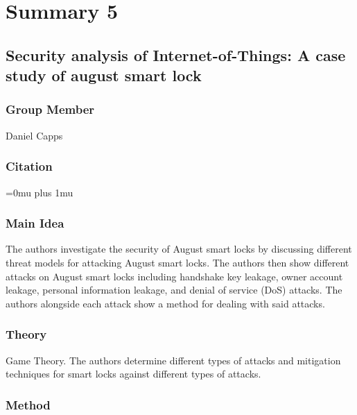 \section{Summary 5}

\noindent
\subsection{{S}ecurity analysis of {I}nternet-of-{T}hings: {A} case study of august smart lock}

\subsubsection{Group Member}

\noindent
Daniel Capps

\noindent
\subsubsection{Citation}

\Urlmuskip=0mu plus 1mu\relax


\subsubsection{Main Idea}

\noindent
The authors investigate the security of August smart locks by discussing different threat models for attacking August smart locks. The authors then show different attacks on August smart locks including handshake key leakage, owner account leakage, personal information leakage, and denial of service (DoS) attacks. The authors alongside each attack show a method for dealing with said attacks.
 
\subsubsection{Theory}

\noindent
Game Theory. The authors determine different types of attacks and mitigation techniques for smart locks against different types of attacks.

\subsubsection{Method}

